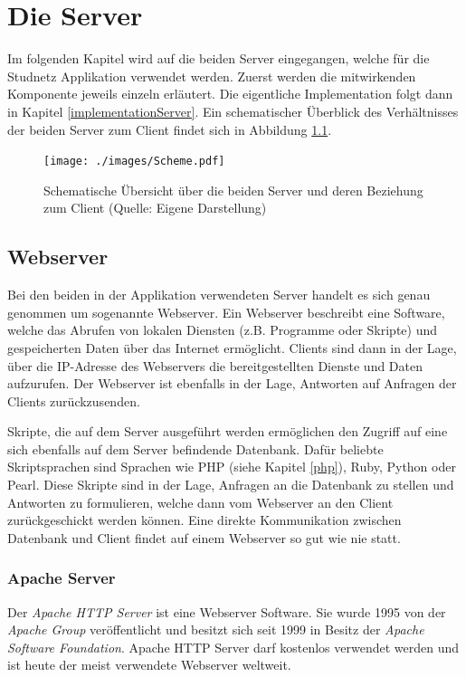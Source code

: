 \documentclass[../main.tex]{subfiles}
\begin{document}
	\chapter{Die Server}
	Im folgenden Kapitel wird auf die beiden Server eingegangen, welche für die Studnetz Applikation verwendet werden. Zuerst werden die mitwirkenden Komponente jeweils einzeln erläutert. Die eigentliche Implementation folgt dann in Kapitel \ref{implementationServer}. Ein schematischer Überblick des Verhältnisses der beiden Server zum Client findet sich in Abbildung \ref{ServerClientSchema}.
	
	\begin{figure} 
		\centering
		\texttt{[image: ./images/Scheme.pdf]}
		\caption{Schematische Übersicht über die beiden Server und deren Beziehung zum Client (Quelle: Eigene Darstellung)}
		\label{ServerClientSchema}
	\end{figure}
	
	\section{Webserver}
	Bei den beiden in der Applikation verwendeten Server handelt es sich genau genommen um sogenannte Webserver. Ein Webserver beschreibt eine Software, welche das Abrufen von lokalen Diensten (z.B. Programme oder Skripte) und gespeicherten Daten über das Internet ermöglicht. Clients sind dann in der Lage, über die IP-Adresse des Webservers die bereitgestellten Dienste und Daten aufzurufen. Der Webserver ist ebenfalls in der Lage, Antworten auf Anfragen der Clients zurückzusenden. 
		
 	Skripte, die auf dem Server ausgeführt werden ermöglichen den Zugriff auf eine sich ebenfalls auf dem Server befindende Datenbank. Dafür beliebte Skriptsprachen sind Sprachen wie PHP (siehe Kapitel \ref{php}), Ruby, Python oder Pearl. Diese Skripte sind in der Lage, Anfragen an die Datenbank zu stellen und Antworten zu formulieren, welche dann vom Webserver an den Client zurückgeschickt werden können. Eine direkte Kommunikation zwischen Datenbank und Client findet auf einem Webserver so gut wie nie statt.
	
	\subsection{Apache Server}
	Der \emph{Apache HTTP Server} ist eine Webserver Software. Sie wurde 1995 von der \emph{Apache Group} veröffentlicht und besitzt sich seit 1999 in Besitz der \emph{Apache Software Foundation}. Apache HTTP Server darf kostenlos verwendet werden und ist heute der meist verwendete Webserver weltweit. \cite{apache}
	
\end{document}
